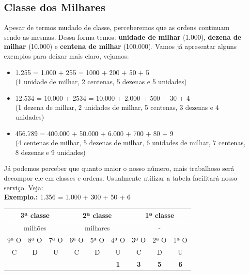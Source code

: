 \subsection{Classe dos Milhares}

Apesar de termos mudado de classe, perceberemos que as ordens continuam sendo as mesmas. Dessa forma temos: \textbf{unidade de milhar} (1.000), \textbf{dezena de milhar} (10.000) e \textbf{centena de milhar} (100.000). Vamos já apresentar alguns exemplos para deixar mais claro, vejamos:

\begin{itemize}
    \item 1.255 = 1.000 + 255 = 1000 + 200 + 50 + 5\\
    (1 unidade de milhar, 2 centenas, 5 dezenas e 5 unidades)
    \item 12.534 = 10.000 + 2534 = 10.000 + 2.000 + 500 + 30 + 4\\
    (1 dezena de milhar, 2 unidades de milhar, 5 centenas, 3 dezenas e 4 unidades)
    \item 456.789 = 400.000 + 50.000 + 6.000 + 700 + 80 + 9\\
    (4 centenas de milhar, 5 dezenas de milhar, 6 unidades de milhar, 7 centenas, 8 dezenas e 9 unidades)
\end{itemize}

Já podemos perceber que quanto maior o nosso número, mais trabalhoso será decompor ele em classes e ordens. Usualmente utilizar a tabela facilitará nosso serviço. Veja:\\

\textbf{Exemplo.:} 1.356 = 1.000 + 300 + 50 + 6

\begin{table}[H]
\begin{tabular}{|ccc|ccc|ccc|}
\hline
\multicolumn{3}{|c|}{3ª classe} & \multicolumn{3}{c|}{2ª classe} & \multicolumn{3}{c|}{1ª classe} \\ \hline
\multicolumn{3}{|c|}{milhões} & \multicolumn{3}{c|}{milhares} & \multicolumn{3}{c|}{-} \\ \hline
\multicolumn{1}{|c|}{9ª O} & \multicolumn{1}{c|}{8ª O} & 7ª O & \multicolumn{1}{c|}{6ª O} & \multicolumn{1}{c|}{5ª O} & 4ª O & \multicolumn{1}{c|}{3ª O} & \multicolumn{1}{c|}{2ª O} & 1ª O \\ \hline
\multicolumn{1}{|c|}{C} & \multicolumn{1}{c|}{D} & U & \multicolumn{1}{c|}{C} & \multicolumn{1}{c|}{D} & U & \multicolumn{1}{c|}{C} & \multicolumn{1}{c|}{D} & U \\ \hline
\rowcolor[HTML]{FFFC9E} 
\multicolumn{1}{|c|}{\cellcolor[HTML]{FFFC9E}} & \multicolumn{1}{c|}{\cellcolor[HTML]{FFFC9E}} &  & \multicolumn{1}{c|}{\cellcolor[HTML]{FFFC9E}} & \multicolumn{1}{c|}{\cellcolor[HTML]{FFFC9E}} & \textbf{1} & \multicolumn{1}{c|}{\cellcolor[HTML]{FFFC9E}\textbf{3}} & \multicolumn{1}{c|}{\cellcolor[HTML]{FFFC9E}\textbf{5}} & \textbf{6} \\ \hline
\end{tabular}
\end{table}

